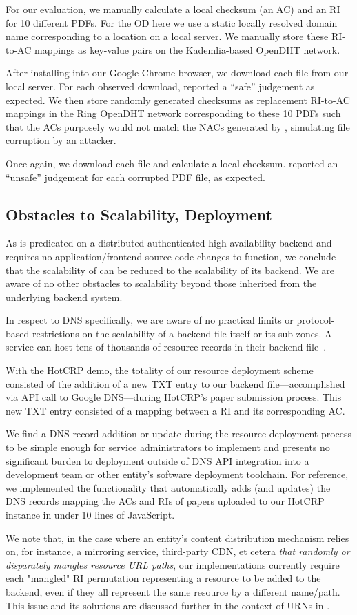 For our evaluation, we manually calculate a local checksum (\ie an AC) and an RI
for 10 different \CONFERENCE{} PDFs. For the OD here we use a static locally
resolved domain name corresponding to a location on a local server. We manually
store these RI-to-AC mappings as key-value pairs on the Kademlia-based OpenDHT
network.

After installing \DHTSYS{} into our Google Chrome browser, we download each file
from our local server. For each observed download, \DHTSYS{} reported a ``safe''
judgement as expected. We then store randomly generated checksums as replacement
RI-to-AC mappings in the Ring OpenDHT network corresponding to these 10 PDFs
such that the ACs purposely would not match the NACs generated by \DHTSYS{},
simulating file corruption by an attacker.

Once again, we download each file and calculate a local checksum. \DHTSYS{}
reported an ``unsafe'' judgement for each corrupted PDF file, as expected.

\subsection{Obstacles to Scalability, Deployment}

As \SYSTEM{} is predicated on a distributed authenticated high availability
backend and requires no application/frontend source code changes to function, we
conclude that the scalability of \SYSTEM{} can be reduced to the scalability of
its backend. We are aware of no other obstacles to scalability beyond those
inherited from the underlying backend system.

In respect to DNS specifically, we are aware of no practical limits or
protocol-based restrictions on the scalability of a backend file itself or its
sub-zones. A service can host tens of thousands of resource records in their
backend file~\cite{DNS1, DNS2}.

With the HotCRP demo, the totality of our resource deployment scheme consisted
of the addition of a new TXT entry to our backend file---accomplished via API
call to Google DNS---during HotCRP's paper submission process. This new TXT
entry consisted of a mapping between a RI and its corresponding AC.

We find a DNS record addition or update during the resource deployment process
to be simple enough for service administrators to implement and presents no
significant burden to deployment outside of DNS API integration into a
development team or other entity's software deployment toolchain. For reference,
we implemented the functionality that automatically adds (and updates) the DNS
records mapping the ACs and RIs of papers uploaded to our HotCRP instance in
under 10 lines of JavaScript.

We note that, in the case where an entity's content distribution mechanism
relies on, for instance, a mirroring service, third-party CDN, et cetera
\emph{that randomly or disparately mangles resource URL paths}, our
implementations currently require each "mangled" RI permutation representing a
resource to be added to the backend, even if they all represent the same
resource by a different name/path. This issue and its solutions are discussed
further in the context of URNs in .
